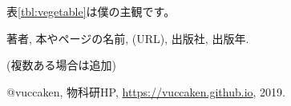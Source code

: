\documentclass[10pt,b5paper,papersize,dvipdfmx]{jsbook}
\begin{document}
表\ref{tbl:vegetable}は僕の主観です。


\begin{thebibliography}{99}
  \item 著者, 本やページの名前, (URL), 出版社, 出版年.
  \item (複数ある場合は追加)
  \item @vuccaken, 物科研HP, \url{https://vuccaken.github.io}, 2019.
\end{thebibliography}
\end{document}
